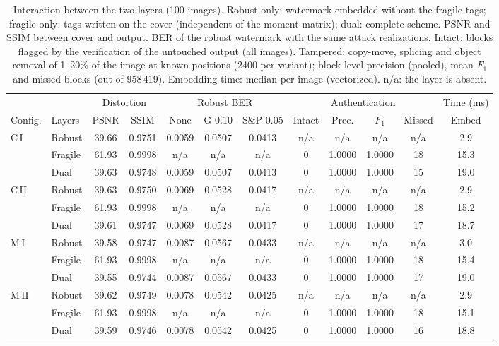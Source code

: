 \begin{table}[t]
\centering
\caption{Interaction between the two layers (100 images). Robust only: watermark embedded without the fragile tags; fragile only: tags written on the cover (independent of the moment matrix); dual: complete scheme. PSNR and SSIM between cover and output. BER of the robust watermark with the same attack realizations. Intact: blocks flagged by the verification of the untouched output (all images). Tampered: copy-move, splicing and object removal of 1--20\% of the image at known positions (2400 per variant); block-level precision (pooled), mean $F_1$ and missed blocks (out of 958\,419). Embedding time: median per image (vectorized). n/a: the layer is absent.}
\label{tab:layer_interaction}
\footnotesize
\setlength{\tabcolsep}{2.5pt}
\begin{tabular}{llcccccccccc}
\toprule
 & & \multicolumn{2}{c}{Distortion} & \multicolumn{3}{c}{Robust BER} & \multicolumn{4}{c}{Authentication} & Time (ms) \\
\cmidrule(lr){3-4}\cmidrule(lr){5-7}\cmidrule(lr){8-11}\cmidrule(lr){12-12}
Config. & Layers & PSNR & SSIM & None & G 0.10 & S\&P 0.05 & Intact & Prec. & $F_1$ & Missed & Embed \\
\midrule
C\,I & Robust & 39.66 & 0.9751 & 0.0059 & 0.0507 & 0.0413 & n/a & n/a & n/a & n/a & 2.9 \\
 & Fragile & 61.93 & 0.9998 & n/a & n/a & n/a & 0 & 1.0000 & 1.0000 & 18 & 15.3 \\
 & Dual & 39.63 & 0.9748 & 0.0059 & 0.0507 & 0.0413 & 0 & 1.0000 & 1.0000 & 15 & 19.0 \\
\midrule
C\,II & Robust & 39.63 & 0.9750 & 0.0069 & 0.0528 & 0.0417 & n/a & n/a & n/a & n/a & 2.9 \\
 & Fragile & 61.93 & 0.9998 & n/a & n/a & n/a & 0 & 1.0000 & 1.0000 & 18 & 15.2 \\
 & Dual & 39.61 & 0.9747 & 0.0069 & 0.0528 & 0.0417 & 0 & 1.0000 & 1.0000 & 17 & 18.7 \\
\midrule
M\,I & Robust & 39.58 & 0.9747 & 0.0087 & 0.0567 & 0.0433 & n/a & n/a & n/a & n/a & 3.0 \\
 & Fragile & 61.93 & 0.9998 & n/a & n/a & n/a & 0 & 1.0000 & 1.0000 & 18 & 15.4 \\
 & Dual & 39.55 & 0.9744 & 0.0087 & 0.0567 & 0.0433 & 0 & 1.0000 & 1.0000 & 17 & 19.0 \\
\midrule
M\,II & Robust & 39.62 & 0.9749 & 0.0078 & 0.0542 & 0.0425 & n/a & n/a & n/a & n/a & 2.9 \\
 & Fragile & 61.93 & 0.9998 & n/a & n/a & n/a & 0 & 1.0000 & 1.0000 & 18 & 15.1 \\
 & Dual & 39.59 & 0.9746 & 0.0078 & 0.0542 & 0.0425 & 0 & 1.0000 & 1.0000 & 16 & 18.8 \\
\bottomrule
\end{tabular}
\end{table}
